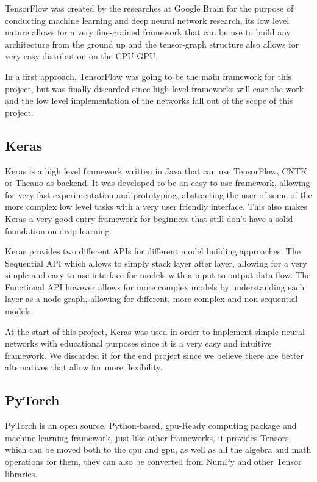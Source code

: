 TensorFlow was created by the researches at Google Brain for the purpose of conducting machine learning and deep neural network research, its low level nature allows for a very fine-grained framework that can be use to build any architecture from the ground up and the tensor-graph structure also allows for very easy distribution on the CPU-GPU.

In a first approach, TensorFlow was going to be the main framework for this project, but was finally discarded since high level frameworks will ease the work and the low level implementation of the networks fall out of the scope of this project.

\subsection{Keras}
Keras is a high level framework written in Java that can use TensorFlow, CNTK or Theano as backend. It was developed to be an easy to use framework, allowing for very fast experimentation and prototyping, abstracting the user of some of the more complex low level tasks with a very user friendly interface. This also makes Keras a very good entry framework for beginners that still don't have a solid foundation on deep learning.

Keras provides two different APIs for different model building approaches. The Sequential API which allows to simply stack layer after layer, allowing for a very simple and easy to use interface for models with a input to output data flow. The Functional API however allows for more complex models by understanding each layer as a node graph, allowing for different, more complex and non sequential models.

At the start of this project, Keras was used in order to implement simple neural networks with educational purposes since it is a very easy and intuitive framework. We discarded it for the end project since we believe there are better alternatives that allow for more flexibility.
 
\subsection{PyTorch}
PyTorch is an open source, Python-based, \gls{gpu}-Ready computing package and machine learning framework, just like other frameworks, it provides Tensors, which can be moved both to the \gls{cpu} and \gls{gpu}, as well as all the algebra and math operations for them, they can also be converted from NumPy and other Tensor libraries.

